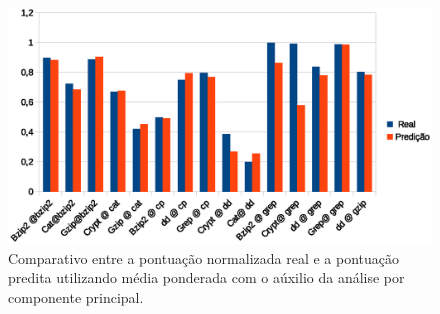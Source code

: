 \begin{figure}[!htb]
\centering
\includegraphics [keepaspectratio=true,scale=1.0]{graficos/mean_predict.eps}
\caption{Comparativo entre a pontuação normalizada real e a pontuação predita utilizando média ponderada com o aúxilio da análise por componente principal.}
\label{mean_predict}
\end{figure}   



  

